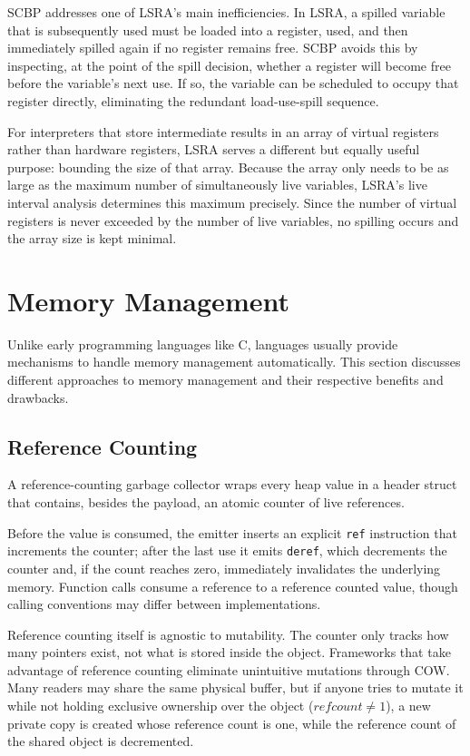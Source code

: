 \acf{SCBP} addresses one of \ac{LSRA}'s main inefficiencies. In \ac{LSRA}, a spilled variable that is subsequently used must be loaded into a register, used, and then immediately spilled again if no register remains free. \ac{SCBP} avoids this by inspecting, at the point of the spill decision, whether a register will become free before the variable's next use. If so, the variable can be scheduled to occupy that register directly, eliminating the redundant load-use-spill sequence.

For interpreters that store intermediate results in an array of virtual registers rather than hardware registers, \ac{LSRA} serves a different but equally useful purpose: bounding the size of that array. Because the array only needs to be as large as the maximum number of simultaneously live variables, \ac{LSRA}'s live interval analysis determines this maximum precisely. Since the number of virtual registers is never exceeded by the number of live variables, no spilling occurs and the array size is kept minimal\cite{schwarz-register, poletto1999linear}.

\section{Memory Management}

Unlike early programming languages like C, languages usually provide mechanisms to handle memory management automatically. This section discusses different approaches to memory management and their respective benefits and drawbacks.

\subsection{Reference Counting}

A reference-counting garbage collector wraps every heap value in a header struct that contains, besides the payload, an atomic counter of live references.

Before the value is consumed, the emitter inserts an explicit \texttt{ref} instruction that increments the counter; after the last use it emits \texttt{deref}, which decrements the counter and, if the count reaches zero, immediately invalidates the underlying memory. Function calls consume a reference to a reference counted value, though calling conventions may differ between implementations.

Reference counting itself is agnostic to mutability. The counter only tracks how many pointers exist, not what is stored inside the object. Frameworks that take advantage of reference counting eliminate unintuitive mutations through \acf{COW}. Many readers may share the same physical buffer, but if anyone tries to mutate it while not holding exclusive ownership over the object ($refcount \neq 1$), a new private copy is created whose reference count is one, while the reference count of the shared object is decremented.

